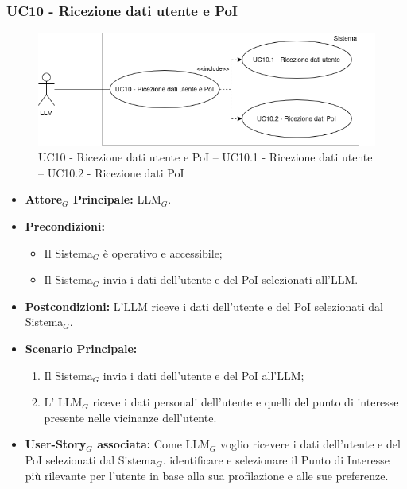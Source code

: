 \documentclass[10pt]{article}
\begin{document}
\begin{justify}
\subsubsection{\textbf{UC10 - Ricezione dati utente e PoI}}
\begin{figure}[H]
    \centering
    \includegraphics[width=0.7\linewidth]{UC10image.png}
    \caption{UC10 - Ricezione dati utente e PoI -- UC10.1 - Ricezione dati utente -- UC10.2 - Ricezione dati PoI}
    \label{fig:UC10}
\end{figure}
\label{UC10}
\begin{itemize}
    \item \textbf{Attore$_G$ Principale:} LLM$_G$.
    \item \textbf{Precondizioni:} 
        \begin{itemize}
        \item Il Sistema$_G$ è operativo e accessibile;
          \item Il Sistema$_G$ invia i dati dell'utente e del PoI selezionati all'LLM.
        \end{itemize}
      \item \textbf{Postcondizioni:} L'LLM riceve i dati dell'utente e del PoI selezionati dal Sistema$_G$.
    \item \textbf{Scenario Principale:} 
        \begin{enumerate}
          \item Il Sistema$_G$ invia i dati dell'utente e del PoI all'LLM;
        \item L' LLM$_G$ riceve i dati personali dell'utente e quelli del punto di interesse presente nelle vicinanze dell'utente.
        \end{enumerate}
      \item \textbf{User-Story$_G$ associata:} Come LLM$_G$ voglio ricevere i dati dell'utente e del PoI selezionati dal Sistema$_G$.
        identificare e selezionare il Punto di Interesse più rilevante per l'utente in base alla sua profilazione e alle sue preferenze.
\end{itemize}

\end{justify}
\end{document}
